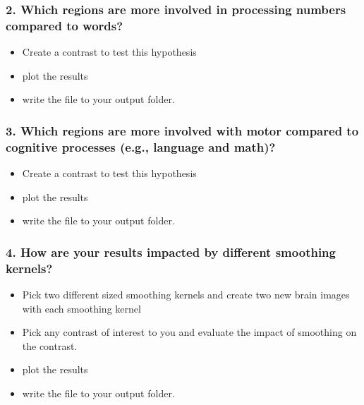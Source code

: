 \documentclass[letterpaper,10pt,english]{sphinxmanual}
\begin{document}
\subsubsection{2. Which regions are more involved in processing numbers compared to words?}
\label{\detokenize{content/GLM_Single_Subject_Model:which-regions-are-more-involved-in-processing-numbers-compared-to-words}}\begin{itemize}
\item {} 
Create a contrast to test this hypothesis

\item {} 
plot the results

\item {} 
write the file to your output folder.

\end{itemize}


\subsubsection{3. Which regions are more involved with motor compared to cognitive processes (e.g., language and math)?}
\label{\detokenize{content/GLM_Single_Subject_Model:which-regions-are-more-involved-with-motor-compared-to-cognitive-processes-e-g-language-and-math}}\begin{itemize}
\item {} 
Create a contrast to test this hypothesis

\item {} 
plot the results

\item {} 
write the file to your output folder.

\end{itemize}


\subsubsection{4. How are your results impacted by different smoothing kernels?}
\label{\detokenize{content/GLM_Single_Subject_Model:how-are-your-results-impacted-by-different-smoothing-kernels}}\begin{itemize}
\item {} 
Pick two different sized smoothing kernels and create two new brain images with each smoothing kernel

\item {} 
Pick any contrast of interest to you and evaluate the impact of smoothing on the contrast.

\item {} 
plot the results

\item {} 
write the file to your output folder.

\end{itemize}
\end{document}
